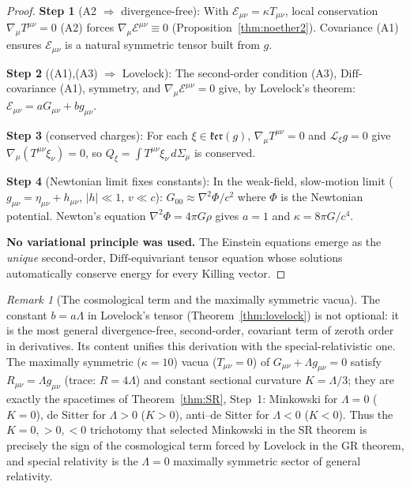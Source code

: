 \documentclass[11pt,twocolumn]{article}
\theoremstyle{plain}\newtheorem{theorem}{Theorem}\newtheorem{proposition}[theorem]{Proposition}\newtheorem{corollary}[theorem]{Corollary}\newtheorem{lemma}[theorem]{Lemma}
\theoremstyle{definition}\newtheorem{definition}[theorem]{Definition}
\theoremstyle{remark}\newtheorem{remark}[theorem]{Remark}
\newcommand{\Diff}{\mathrm{Diff}}
\begin{document}
\begin{proof}
\textbf{Step 1} (A2 $\Rightarrow$ divergence-free): With $\mathcal{E}_{\mu\nu} = \kappa T_{\mu\nu}$, local conservation $\nabla_\mu T^{\mu\nu} = 0$ (A2) forces $\nabla_\mu\mathcal{E}^{\mu\nu} \equiv 0$ (Proposition~\ref{thm:noether2}). Covariance (A1) ensures $\mathcal{E}_{\mu\nu}$ is a natural symmetric tensor built from $g$.

\textbf{Step 2} ((A1),(A3) $\Rightarrow$ Lovelock): The second-order condition (A3), $\Diff$-covariance (A1), symmetry, and $\nabla_\mu\mathcal{E}^{\mu\nu} = 0$ give, by Lovelock's theorem: $\mathcal{E}_{\mu\nu} = aG_{\mu\nu} + bg_{\mu\nu}$.

\textbf{Step 3} (conserved charges): For each $\xi \in \mathfrak{ker}(g)$, $\nabla_\mu T^{\mu\nu} = 0$ and $\mathcal{L}_\xi g = 0$ give $\nabla_\mu(T^{\mu\nu}\xi_\nu) = 0$, so $Q_\xi = \int T^{\mu\nu}\xi_\nu\,d\Sigma_\mu$ is conserved.

\textbf{Step 4} (Newtonian limit fixes constants): In the weak-field, slow-motion limit ($g_{\mu\nu} = \eta_{\mu\nu} + h_{\mu\nu}$, $|h| \ll 1$, $v \ll c$): $G_{00} \approx \nabla^2\Phi/c^2$ where $\Phi$ is the Newtonian potential. Newton's equation $\nabla^2\Phi = 4\pi G\rho$ gives $a = 1$ and $\kappa = 8\pi G/c^4$.

\textbf{No variational principle was used.} The Einstein equations emerge as the \emph{unique} second-order, $\Diff$-equivariant tensor equation whose solutions automatically conserve energy for every Killing vector.
\end{proof}


\begin{remark}[The cosmological term and the maximally symmetric vacua]\label{rem:lambda-vacua}
The constant $b=a\Lambda$ in Lovelock's tensor (Theorem~\ref{thm:lovelock}) is not optional: it is the most
general divergence-free, second-order, covariant term of zeroth order in derivatives. Its content unifies this
derivation with the special-relativistic one. The maximally symmetric ($\kappa=10$) vacua ($T_{\mu\nu}=0$) of
$G_{\mu\nu}+\Lambda g_{\mu\nu}=0$ satisfy $R_{\mu\nu}=\Lambda g_{\mu\nu}$ (trace: $R=4\Lambda$) and constant
sectional curvature $K=\Lambda/3$; they are exactly the spacetimes of Theorem~\ref{thm:SR}, Step~1: Minkowski
for $\Lambda=0$ ($K=0$), de Sitter for $\Lambda>0$ ($K>0$), anti--de Sitter for $\Lambda<0$ ($K<0$). Thus the
$K=0,>0,<0$ trichotomy that selected Minkowski in the SR theorem is precisely the sign of the cosmological term
forced by Lovelock in the GR theorem, and special relativity is the $\Lambda=0$ maximally symmetric sector of
general relativity.
\end{remark}
\end{document}
